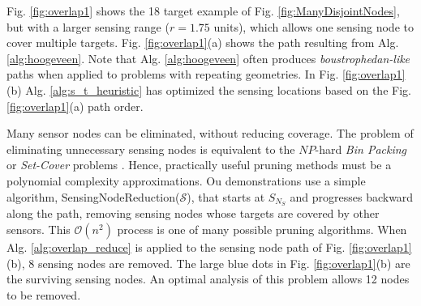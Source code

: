 \documentclass[letterpaper, 10 pt, conference]{ieeeconf}
\theoremstyle{definition}
\newcommand{\Os}{\mathcal{O}}
\newcommand{\Ss}{\mathcal{S}}
\begin{document}
Fig. \ref{fig:overlap1} shows the 18 target example of Fig. \ref{fig:ManyDisjointNodes}, but with a larger sensing range ($r=1.75$ units), which allows one sensing node to cover multiple targets.  Fig. \ref{fig:overlap1}(a) shows the path resulting from Alg. \ref{alg:hoogeveen}. Note that Alg. \ref{alg:hoogeveen} often produces {\em boustrophedan-like} \cite{choset_coverage_2000} paths when applied to problems with repeating geometries. In Fig. \ref{fig:overlap1}(b) Alg. \ref{alg:s_t_heuristic} has optimized the sensing locations based on the Fig. \ref{fig:overlap1}(a) path order.

Many sensor nodes can be eliminated, without reducing coverage. The problem of eliminating unnecessary sensing nodes is equivalent to the $NP$-hard {\em Bin Packing} or {\em Set-Cover} problems \cite{du_applications_1998,approx_alg}.  Hence, practically useful pruning methods must be a polynomial complexity approximations. Ou demonstrations use a simple algorithm, SensingNodeReduction($\Ss$),  that starts at $S_{N_S}$ and progresses backward along the path, removing sensing nodes whose targets are covered by other sensors.  This $\Os(n^2)$ process is one of many possible pruning algorithms. When Alg. \ref{alg:overlap_reduce} is applied to the sensing node path  of Fig. \ref{fig:overlap1}(b), 8 sensing nodes are removed. The large blue dots in Fig. \ref{fig:overlap1}(b) are the surviving sensing nodes.  An optimal analysis of this problem allows 12 nodes to be removed.
%
\end{document}
